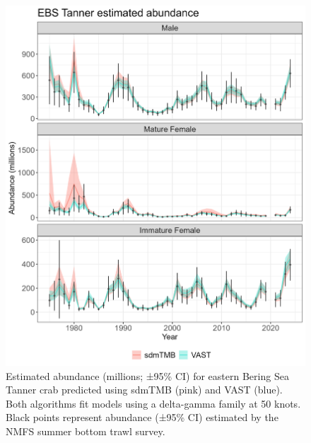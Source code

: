 \documentclass[
]{article}
\begin{document}
\begin{figure}

{\centering \includegraphics[width=1\linewidth,height=1\textheight]{../BAIRDI/Figures/TannerEBS.abundance.sdmTMBVASTindex} 

}

\caption{Estimated abundance (millions; ±95\% CI) for eastern Bering Sea Tanner crab predicted using sdmTMB (pink) and VAST (blue). Both algorithms fit models using a delta-gamma family at 50 knots. Black points represent abundance (±95\% CI) estimated by the NMFS summer bottom trawl survey.}\label{fig:EBSbairdi-abund-compare}
\end{figure}
\end{document}
